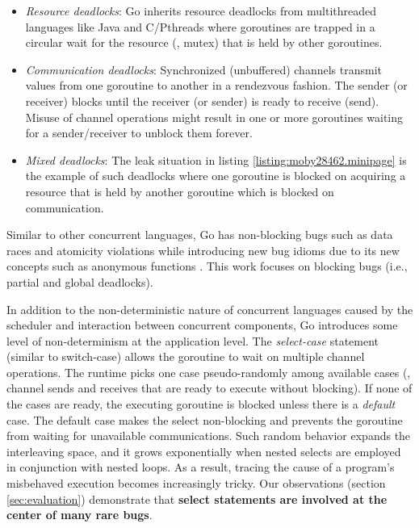 \begin{itemize}
  \item \textit{Resource deadlocks}: Go inherits resource deadlocks from multithreaded languages like Java and C/Pthreads where goroutines are trapped in a circular wait for the resource (\eg, mutex) that is held by other goroutines.
  \item \textit{Communication deadlocks}: Synchronized (unbuffered) channels transmit values from one goroutine to another in a rendezvous fashion. The sender (or receiver) blocks until the receiver (or sender) is ready to receive (send). Misuse of channel operations might result in one or more goroutines waiting for a sender/receiver to unblock them forever.
  \item \textit{Mixed deadlocks}: The leak situation in listing \ref{listing:moby28462.minipage} is the example of such deadlocks where one goroutine is blocked on acquiring a resource that is held by another goroutine which is blocked on communication.
\end{itemize}

Similar to other concurrent languages, Go has non-blocking bugs such as data races and atomicity violations while introducing new bug idioms due to its new concepts such as anonymous functions \cite{tu-concurrentBugs-asplos19}.
%
This work focuses on blocking bugs (i.e., partial and global deadlocks).

In addition to the non-deterministic nature of concurrent languages caused by the scheduler and interaction between concurrent components, Go introduces some level of non-determinism at the application level.
%
The \textit{select-case} statement (similar to switch-case) allows the goroutine to wait on multiple channel operations.
%
The runtime picks one case pseudo-randomly among available cases (\ie, channel sends and receives that are ready to execute without blocking).
%
If none of the cases are ready, the executing goroutine is blocked unless there is a \textit{default} case.
%
The default case makes the select non-blocking and prevents the goroutine from waiting for unavailable communications.
%
Such random behavior expands the interleaving space, and it grows exponentially when nested selects are employed in conjunction with nested loops.
%
As a result, tracing the cause of a program's misbehaved execution becomes increasingly tricky.
%
Our observations (section \ref{sec:evaluation}) demonstrate that \textbf{select statements are involved at the center of many rare bugs}.


